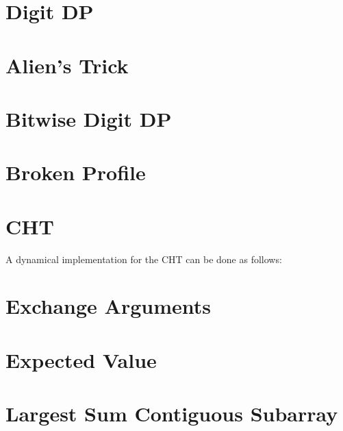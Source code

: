 



\section{Digit DP}




\section{Alien's Trick}




\section{Bitwise Digit DP}




\section{Broken Profile}




\section{CHT}




A dynamical implementation for the CHT can be done as follows:




\section{Exchange Arguments}





\section{Expected Value}




\section{Largest Sum Contiguous Subarray}


